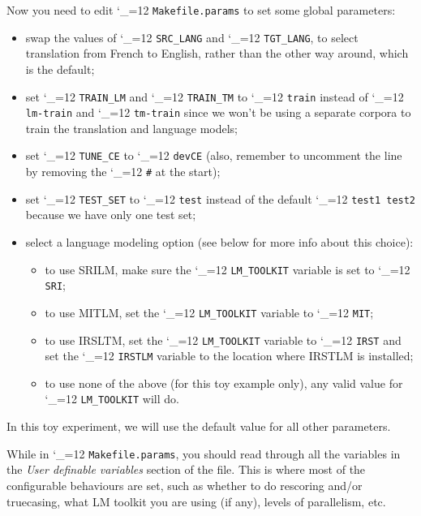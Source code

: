 \documentclass[11pt,letterpaper]{article}
\def\code{\begingroup\catcode`\_=12 \codex}
\newcommand{\codex}[1]{\texttt{#1}\endgroup}
\begin{document}
Now you need to edit \code{Makefile.params} to set some global parameters:
\begin{itemize}
\item swap the values of \code{SRC_LANG} and
\code{TGT_LANG}, to select translation from French to English, rather than
the other way around, which is the default;
\item set \code{TRAIN_LM} and \code{TRAIN_TM} to
\code{train} instead of \code{lm-train} and \code{tm-train} since we
won't be using a separate corpora to train the translation and language models;
\item set \code{TUNE_CE} to \code{devCE} (also, remember to uncomment the
line by removing the \code{\#} at the start);
\item set \code{TEST_SET} to \code{test} instead of the default
  \code{test1 test2} because we have only one test set;
\item select a language modeling option (see below for more info about this
  choice): 
\begin{itemize}
\item to use SRILM, make sure the \code{LM_TOOLKIT} variable is set to
\code{SRI};
\item to use MITLM, set the \code{LM_TOOLKIT} variable to \code{MIT};
\item to use IRSLTM, set the \code{LM_TOOLKIT} variable to \code{IRST} and
set the \code{IRSTLM} variable to the location where IRSTLM is installed;
\item to use none of the above (for this toy example only), any valid value
for \code{LM_TOOLKIT} will do.
\end{itemize}
\end{itemize}
In this toy experiment, we will use the default value for all other parameters.

While in \code{Makefile.params}, you should read through all the variables in
the \emph{User definable variables} section of the file.  This is where most of
the configurable behaviours are set, such as whether to do rescoring and/or
truecasing, what LM toolkit you are using (if any), levels of parallelism, etc. 
\end{document}
